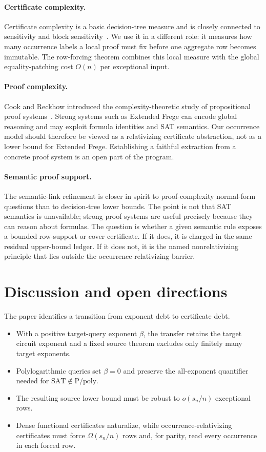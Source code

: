 \documentclass[11pt]{article}
\theoremstyle{definition}
\newcommand{\SAT}{\mathrm{SAT}}
\newcommand{\Ppoly}{\mathrm{P/poly}}
\begin{document}
\paragraph{Certificate complexity.}
Certificate complexity is a basic decision-tree measure and is closely connected to sensitivity and block sensitivity~\cite{Nisan91}. We use it in a different role: it measures how many occurrence labels a local proof must fix before one aggregate row becomes immutable. The row-forcing theorem combines this local measure with the global equality-patching cost $O(n)$ per exceptional input.

\paragraph{Proof complexity.}
Cook and Reckhow introduced the complexity-theoretic study of propositional proof systems~\cite{CR79}. Strong systems such as Extended Frege can encode global reasoning and may exploit formula identities and SAT semantics. Our occurrence model should therefore be viewed as a relativizing certificate abstraction, not as a lower bound for Extended Frege. Establishing a faithful extraction from a concrete proof system is an open part of the program.

\paragraph{Semantic proof support.}
The semantic-link refinement is closer in spirit to proof-complexity normal-form questions than to decision-tree lower bounds. The point is not that SAT semantics is unavailable; strong proof systems are useful precisely because they can reason about formulas. The question is whether a given semantic rule exposes a bounded row-support or cover certificate. If it does, it is charged in the same residual upper-bound ledger. If it does not, it is the named nonrelativizing principle that lies outside the occurrence-relativizing barrier.

\section{Discussion and open directions}\label{sec:discussion}

The paper identifies a transition from exponent debt to certificate debt.

\begin{itemize}
  \item With a positive target-query exponent $\beta$, the transfer retains the target circuit exponent and a fixed source theorem excludes only finitely many target exponents.
  \item Polylogarithmic queries set $\beta=0$ and preserve the all-exponent quantifier needed for $\SAT\notin\Ppoly$.
  \item The resulting source lower bound must be robust to $o(s_n/n)$ exceptional rows.
  \item Dense functional certificates naturalize, while occurrence-relativizing certificates must force $\Omega(s_n/n)$ rows and, for parity, read every occurrence in each forced row.
\end{itemize}
\end{document}
